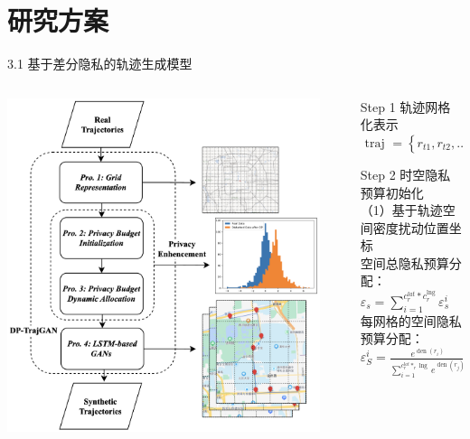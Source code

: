 \documentclass{sintefbeamer}
\begin{document}
\section{研究方案}

\begin{frame}{3.1 基于差分隐私的轨迹生成模型}
\begin{columns}
\begin{column}{0.5\textwidth}
\includegraphics[height=1\textheight]{images/survey1}
\end{column}
\begin{column}{0.5\textwidth}
\begin{itemize}
  \item[Step 1] 轨迹网格化表示
$\text { traj }=\left\{r_{t 1}, r_{t 2}, \ldots, r_{t j}\right\}, \forall r_{t j} \in R$
  \item[Step 2] 时空隐私预算初始化\\
  （1）基于轨迹空间密度扰动位置坐标\\
空间总隐私预算分配：\\$\varepsilon_s=\sum_{i=1}^{c_r^{l a t} * c_r^{\operatorname{lng}}} \varepsilon_s^i$\\
每网格的空间隐私预算分配：\\$\varepsilon_S^i=\frac{e^{\operatorname{den}\left(r_i\right)}}{\sum_{i=1}^{c_r^{l a t} *_r \operatorname{lng}} e^{\operatorname{den}\left(r_j\right)}}$\\

\end{itemize}
\end{column}
\end{columns}
\end{frame}
\end{document}

